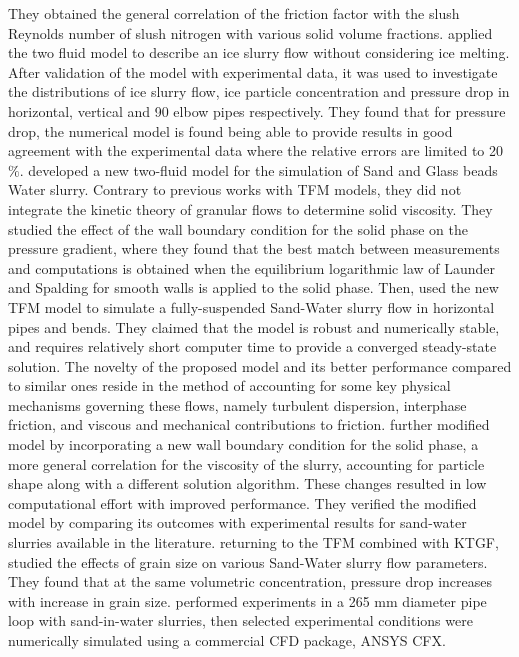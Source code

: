 \documentclass[11pt]{report}
\begin{document}
%
They obtained the general correlation of the friction factor with the slush Reynolds number of slush nitrogen with various solid volume fractions.
%
\citet{Wang-2013} applied the two fluid model to describe an ice slurry flow without considering ice melting.
%
After validation of the model with experimental data, it was used to investigate the distributions of ice slurry flow, ice particle concentration and pressure drop in horizontal, vertical and 90 elbow pipes respectively.
%
They found that for pressure drop, the numerical model is found being able to provide results in good agreement with the experimental data where the relative errors are limited to 20$\%$.
%
\citet{Messa-2013} developed a new two-fluid model for the simulation of Sand and Glass beads Water slurry.
%
Contrary to previous works with TFM models, they did not integrate the kinetic theory of granular flows to determine solid viscosity.
%
They studied the effect of the wall boundary condition for the solid phase on the pressure gradient, where they found that the best match between measurements and computations is obtained when the equilibrium logarithmic law of Launder and Spalding for smooth walls is applied to the solid phase.
%
Then, \citet{Messa-2014} used the new TFM model to  simulate a fully-suspended Sand-Water slurry flow in horizontal pipes and bends.
%
They claimed that the model is robust and numerically stable, and requires relatively short computer time to provide a converged steady-state solution.
%
The novelty of the proposed model and its better performance compared to similar ones reside in the method of accounting for some key physical mechanisms governing these flows, namely turbulent dispersion, interphase friction, and viscous and mechanical contributions to friction.
%
\citet{Messa-2015} further modified \citet{Messa-2014} model by incorporating a new wall boundary condition for the solid phase, a more general correlation for the viscosity of the slurry, accounting for particle shape along with a different solution algorithm. These changes resulted in low computational effort with improved performance.
%
They verified the modified model by comparing its outcomes with experimental results for sand-water slurries available in the literature. returning to the TFM combined with KTGF, \citet{Gopaliya-2014} studied the effects of grain size on various Sand-Water slurry flow parameters.
%
They found that at the same  volumetric concentration, pressure drop increases with increase in grain size.
%
\citet{Hashemi-2016} performed experiments in a 265 mm diameter pipe loop with sand-in-water slurries, then selected experimental conditions were  numerically simulated using a commercial CFD package, ANSYS CFX.
\end{document}
